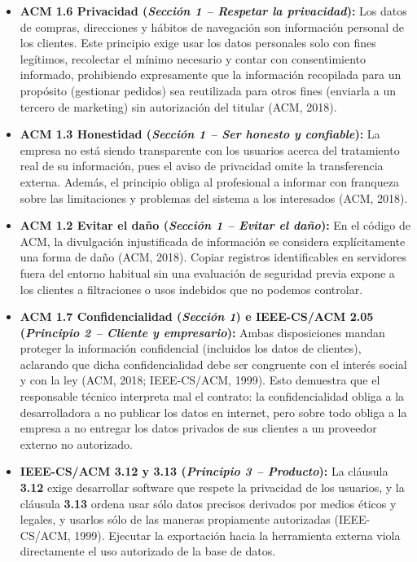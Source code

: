 \documentclass[12pt,a4paper,oneside]{article}
\begin{document}
\begin{itemize}[leftmargin=1.8em,itemsep=4pt]
    \item \textbf{ACM 1.6 Privacidad (\textit{Sección 1 -- Respetar la privacidad}):} Los datos de compras, direcciones y hábitos de navegación son información personal de los clientes. Este principio exige usar los datos personales solo con fines legítimos, recolectar el mínimo necesario y contar con consentimiento informado, prohibiendo expresamente que la información recopilada para un propósito (gestionar pedidos) sea reutilizada para otros fines (enviarla a un tercero de marketing) sin autorización del titular (ACM, 2018).
    \item \textbf{ACM 1.3 Honestidad (\textit{Sección 1 -- Ser honesto y confiable}):} La empresa no está siendo transparente con los usuarios acerca del tratamiento real de su información, pues el aviso de privacidad omite la transferencia externa. Además, el principio obliga al profesional a informar con franqueza sobre las limitaciones y problemas del sistema a los interesados (ACM, 2018).
    \item \textbf{ACM 1.2 Evitar el daño (\textit{Sección 1 -- Evitar el daño}):} En el código de ACM, la divulgación injustificada de información se considera explícitamente una forma de daño (ACM, 2018). Copiar registros identificables en servidores fuera del entorno habitual sin una evaluación de seguridad previa expone a los clientes a filtraciones o usos indebidos que no podemos controlar.
    \item \textbf{ACM 1.7 Confidencialidad (\textit{Sección 1}) e IEEE-CS/ACM 2.05 (\textit{Principio 2 -- Cliente y empresario}):} Ambas disposiciones mandan proteger la información confidencial (incluidos los datos de clientes), aclarando que dicha confidencialidad debe ser congruente con el interés social y con la ley (ACM, 2018; IEEE-CS/ACM, 1999). Esto demuestra que el responsable técnico interpreta mal el contrato: la confidencialidad obliga a la desarrolladora a no publicar los datos en internet, pero sobre todo obliga a la empresa a no entregar los datos privados de sus clientes a un proveedor externo no autorizado.
    \item \textbf{IEEE-CS/ACM 3.12 y 3.13 (\textit{Principio 3 -- Producto}):} La cláusula \textbf{3.12} exige desarrollar software que respete la privacidad de los usuarios, y la cláusula \textbf{3.13} ordena \guillemotleft usar sólo datos precisos derivados por medios éticos y legales, y usarlos sólo de las maneras propiamente autorizadas\guillemotright{} (IEEE-CS/ACM, 1999). Ejecutar la exportación hacia la herramienta externa viola directamente el uso autorizado de la base de datos.

\end{itemize}
\end{document}
